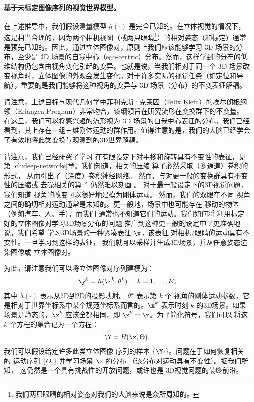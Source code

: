 \documentclass[../../book-main_zh.tex]{subfiles}
\begin{document}
\paragraph{基于未标定图像序列的视觉世界模型。}

在上述推导中，我们假设测量模型 $h(\cdot)$ 是完全已知的。在立体视觉的情况下，这是相当合理的，因为两个相机视图（或两只眼睛\footnote{我们两只眼睛的相对姿态对我们的大脑来说是众所周知的。}）的相对姿态（和标定）通常是预先已知的。因此，通过立体图像对，原则上我们应该能够学习 3D 场景的分布，至少是 3D 场景的自我中心（ego-centric）分布。然而，这样学到的分布的低维结构仍包含由视角变化引起的变异。也就是说，当我们相对于同一个 3D 场景改变视角时，立体图像的外观会发生变化。对于许多实际的视觉任务（如定位和导航），重要的是我们能够将这种视角的变异与 3D 场景（分布）的不变表征解耦。

\begin{remark}请注意，上述目标与现代几何学中菲利克斯·克莱因（Felix Klein）的埃尔朗根纲领（Erlangen Program）非常吻合，该纲领旨在研究流形在变换群下的不变量。在这里，我们可以将感兴趣的流形视为 3D 场景的自我中心表征的分布。我们已经看到，其上存在一组三维刚体运动的群作用。值得注意的是，我们的大脑已经学会了有效地将此类变换与观测到的3D世界解耦。
\end{remark}

请注意，我们已经研究了学习
在有限设定下对平移和旋转具有不变性的表征，见第
\ref{ch:deep-networks}章。我们知道，相关的压缩
算子必然采取（多通道）卷积的形式，
从而引出了（深度）卷积神经网络。
然而，与对更一般的变换群具有不变性的压缩或
去噪相关的算子
仍然难以刻画 \cite{cohen2016group}。
对于最一般设定下的3D视觉问题，我们知道
视角的改变可以很好地建模为刚体运动。
然而，我们的双眼在不同
视角之间的确切相对运动通常是未知的。更一般地，场景中也可能存在
移动的物体（例如汽车、人、手），而我们
通常也不知道它们的运动。我们如何将
利用标定好的立体图像对学习3D场景分布的问题
推广到这种更一般的设定中？更准确地说，我们希望
学习3D场景的一种紧凑表征 $\x$，该表征
对相机/眼睛的运动具有不变性。一旦学习到这样的表征，
我们就可以采样并生成3D场景，并从任意姿态渲染图像或
立体图像对。

为此，请注意我们可以将立体图像对序列建模为：
\begin{equation}
    \y^k = h(\x^k, \theta^k), \quad k=1, \ldots, K,
\end{equation}
其中 $h(\cdot)$ 表示从3D到2D的投影映射。
$\theta^k$ 表示第 $k$ 个
视角的刚体运动参数，它是相对于世界坐标系中某个规范坐标系而言的。$\x^k$
表示时刻 $k$ 的3D场景。如果场景是静态的，$\x^k$
应该全都相同，即 $\x^k = \x$。为了简化符号，我们可以
将这 $k$ 个方程的集合记为一个方程：
\begin{equation}
    \Y = H(\x,\Theta).
\end{equation}
我们可以假设给定许多此类立体图像
序列的样本 $\{\Y_i\}$。问题在于如何恢复相关的
运动序列 $\{\Theta_i\}$ 并学习场景 $\x$ 的分布
（该分布对运动具有不变性）。据我们所知，
这仍然是一个具有挑战性的开放问题，或许也是
3D视觉问题的最终前沿。
\end{document}
